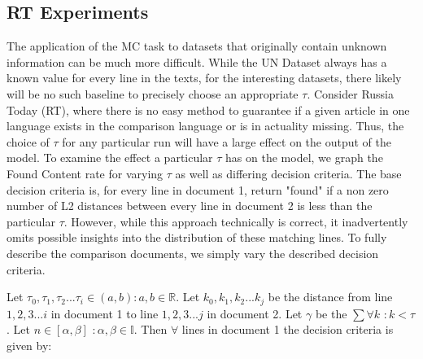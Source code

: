 \documentclass[11pt]{article}
\newcommand{\fixme}[1]{\textbf{FIXME: {#1}}}
\begin{document}










\subsection{RT Experiments}
The application of the MC task to datasets that originally contain unknown information can be much more difficult. While the UN Dataset always has a known value for every line in the texts, for the interesting datasets, there likely will be no such baseline to precisely choose an appropriate $\tau$. Consider Russia Today (RT), where there is no easy method to guarantee if a given article in one language exists in the comparison language or is in actuality missing. Thus, the choice of $\tau$ for any particular run will have a large effect on the output of the model. To examine the effect a particular $\tau$ has on the model, we graph the Found Content rate for varying $\tau$ as well as differing decision criteria. The base decision criteria is, for every line in document 1, return "found" if a non zero number of L2 distances between every line in document 2 is less than the particular $\tau$. However, while this approach technically is correct, it inadvertently omits possible insights into the distribution of these matching lines. To fully describe the comparison documents, we simply vary the described decision criteria. 

Let $\tau_0,\tau_1,\tau_2...\tau_i \in (a,b): a,b \in \mathbb{R}$.
Let $k_0,k_1,k_2...k_j$ be the distance from line $1,2,3...i$ in document 1 to line $1,2,3...j$ in document 2. 
Let $\gamma$ be the $\sum \forall k$ $:k<\tau$.
Let $n \in [\alpha,\beta]$ $:\alpha,\beta\in \mathbb{I}$. 
Then $\forall$ lines in document 1 the decision criteria is given by:
\end{document}
